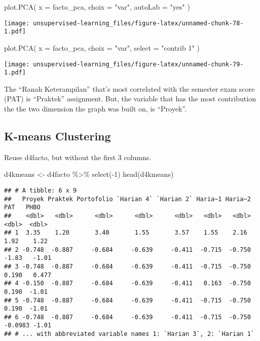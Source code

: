 \documentclass[
]{article}
\newenvironment{Shaded}{\begin{snugshade}}{\end{snugshade}}
\newcommand{\AttributeTok}[1]{\textcolor[rgb]{0.77,0.63,0.00}{#1}}
\newcommand{\DecValTok}[1]{\textcolor[rgb]{0.00,0.00,0.81}{#1}}
\newcommand{\FunctionTok}[1]{\textcolor[rgb]{0.00,0.00,0.00}{#1}}
\newcommand{\NormalTok}[1]{#1}
\newcommand{\OtherTok}[1]{\textcolor[rgb]{0.56,0.35,0.01}{#1}}
\newcommand{\SpecialCharTok}[1]{\textcolor[rgb]{0.00,0.00,0.00}{#1}}
\newcommand{\StringTok}[1]{\textcolor[rgb]{0.31,0.60,0.02}{#1}}
\begin{document}
\begin{Shaded}
\begin{Highlighting}[]
\FunctionTok{plot.PCA}\NormalTok{(}
  \AttributeTok{x =}\NormalTok{ facto\_pca, }
  \AttributeTok{choix =} \StringTok{"var"}\NormalTok{,}
  \AttributeTok{autoLab =} \StringTok{"yes"}
\NormalTok{)}
\end{Highlighting}
\end{Shaded}

\texttt{[image: unsupervised-learning\_files/figure-latex/unnamed-chunk-78-1.pdf]}

\begin{Shaded}
\begin{Highlighting}[]
\FunctionTok{plot.PCA}\NormalTok{(}
  \AttributeTok{x =}\NormalTok{ facto\_pca, }
  \AttributeTok{choix =} \StringTok{"var"}\NormalTok{,}
  \AttributeTok{select =} \StringTok{"contrib 1"}
\NormalTok{)}
\end{Highlighting}
\end{Shaded}

\texttt{[image: unsupervised-learning\_files/figure-latex/unnamed-chunk-79-1.pdf]}

The ``Ranah Keterampilan'' that's most correlated with the semester exam
score (PAT) is ``Praktek'' assignment. But, the variable that has the
most contribution the the two dimension the graph was built on, is
``Proyek''.

\hypertarget{k-means-clustering}{%
\subsection{K-means Clustering}\label{k-means-clustering}}

Reuse d4facto, but without the first 3 columns.

\begin{Shaded}
\begin{Highlighting}[]
\NormalTok{d4kmeans }\OtherTok{\textless{}{-}}\NormalTok{ d4facto }\SpecialCharTok{\%\textgreater{}\%} 
  \FunctionTok{select}\NormalTok{(}\SpecialCharTok{{-}}\DecValTok{1}\NormalTok{)}
\FunctionTok{head}\NormalTok{(d4kmeans)}
\end{Highlighting}
\end{Shaded}

\begin{verbatim}
## # A tibble: 6 x 9
##   Proyek Praktek Portofolio `Harian 4` `Harian 2` Haria~1 Haria~2     PAT   PHBO
##    <dbl>   <dbl>      <dbl>      <dbl>      <dbl>   <dbl>   <dbl>   <dbl>  <dbl>
## 1  3.35    1.20       3.40       1.55       3.57    1.55    2.16   1.92    1.22 
## 2 -0.748  -0.887     -0.684     -0.639     -0.411  -0.715  -0.750 -1.83   -1.01 
## 3 -0.748  -0.887     -0.684     -0.639     -0.411  -0.715  -0.750  0.190   0.477
## 4 -0.150  -0.887     -0.684     -0.639     -0.411   0.163  -0.750  0.190  -1.01 
## 5 -0.748  -0.887     -0.684     -0.639     -0.411  -0.715  -0.750  0.190  -1.01 
## 6 -0.748  -0.887     -0.684     -0.639     -0.411  -0.715  -0.750 -0.0983 -1.01 
## # ... with abbreviated variable names 1: `Harian 3`, 2: `Harian 1`
\end{verbatim}
\end{document}

